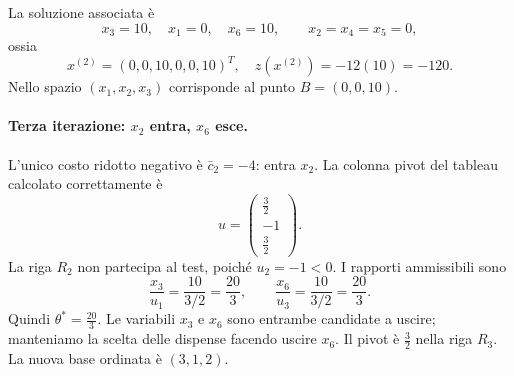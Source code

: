 La soluzione associata \`e
\[
x_3=10,\quad x_1=0,\quad x_6=10,\qquad x_2=x_4=x_5=0,
\]
ossia
\[
x^{(2)}=(0,0,10,0,0,10)^T,\quad z(x^{(2)})=-12(10)=-120.
\]
Nello spazio $(x_1,x_2,x_3)$ corrisponde al punto $B=(0,0,10)$.

\paragraph{Terza iterazione: $x_2$ entra, $x_6$ esce.}
L'unico costo ridotto negativo è $\bar c_2=-4$: entra $x_2$. La colonna pivot del tableau calcolato correttamente è
\[
u=\begin{pmatrix}\frac32\\-1\\\frac32\end{pmatrix}.
\]
La riga $R_2$ non partecipa al test, poiché $u_2=-1<0$. I rapporti ammissibili sono
\[
\frac{x_3}{u_1}=\frac{10}{3/2}=\frac{20}{3},\qquad
\frac{x_6}{u_3}=\frac{10}{3/2}=\frac{20}{3}.
\]
Quindi $\theta^*=\frac{20}{3}$. Le variabili $x_3$ e $x_6$ sono entrambe candidate a uscire; manteniamo la scelta delle dispense facendo uscire $x_6$. Il pivot è $\frac32$ nella riga $R_3$. La nuova base ordinata è $(3,1,2)$.

